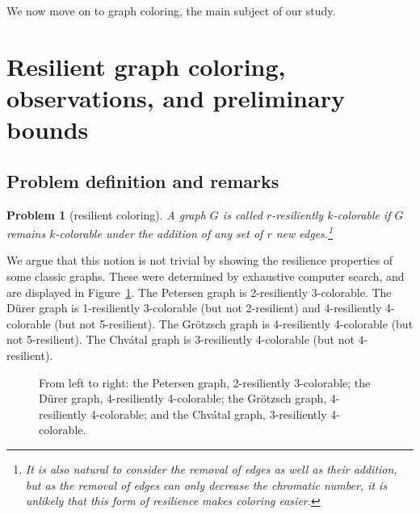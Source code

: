 \documentclass[10pt]{article}
\newtheorem*{prob}{Problem}
\begin{document}
We now move on to graph coloring, the main subject of our study.

\section{Resilient graph coloring, observations, and preliminary bounds}
\label{sec:resilient-coloring-obs-bounds}
\subsection{Problem definition and remarks}

\begin{prob}[resilient coloring] 
A graph $G$ is called \emph{$r$-resiliently
$k$-colorable} if $G$ remains $k$-colorable under the addition of any set of
$r$ new edges.\footnote{It is also natural to consider the removal of edges as
well as their addition, but as the removal of edges can only decrease the
chromatic number, it is unlikely that this form of resilience makes coloring
easier.} 
\end{prob}

We argue that this notion is not trivial by showing the resilience properties
of some classic graphs.  These were determined by exhaustive computer search,
and are displayed in Figure~\ref{fig:famous-graphs}.  The Petersen graph is
2-resiliently 3-colorable. The D{\"u}rer graph is 1-resiliently 3-colorable
(but not 2-resilient) and 4-resiliently 4-colorable (but not 5-resilient). The
Gr{\"o}tzsch graph is 4-resiliently 4-colorable (but not 5-resilient). The
Chv{\'a}tal graph is 3-resiliently 4-colorable (but not 4-resilient).

\begin{figure}
\centering
{}
\caption{From left to right: the Petersen graph, 2-resiliently 3-colorable;
the D{\"u}rer graph, 4-resiliently 4-colorable; the Gr{\"o}tzsch graph,
4-resiliently 4-colorable; and the Chv{\'a}tal graph, 3-resiliently
4-colorable.} 
\label{fig:famous-graphs}
\end{figure}
\end{document}
